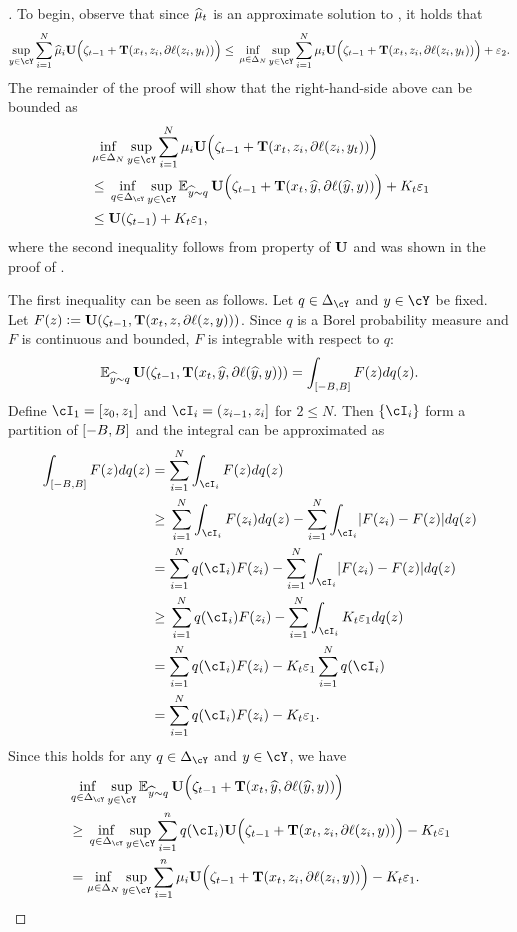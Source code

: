 \begin{proof}[]

To begin, observe that since $\wh{\mu}_{t}$ is an approximate solution to , it holds that
\[
\sup_{y\in\cY}\sum_{i=1}^{N}\wh{\mu}_{i}\burk\Big(\zeta_{t-1} + \suff(x_t,z_{i},\partial \loss(z_{i},y_t))\Big)
\leq{}
\inf_{\mu\in\Delta_{N}}\sup_{y\in\cY}\sum_{i=1}^{N}\mu_{i}\burk\Big(\zeta_{t-1} + \suff(x_t,z_{i},\partial \loss(z_{i},y_t))\Big)
+ \veps_{2}.
\]
The remainder of the proof will show that the right-hand-side above can be bounded as
\begin{align*}
&\inf_{\mu\in\Delta_{N}}\sup_{y\in\cY}\sum_{i=1}^{N}\mu_{i}\burk\Big(\zeta_{t-1} + \suff(x_t,z_{i},\partial \loss(z_{i},y_t))\Big) \\
&\leq{} \inf_{q\in\Delta_{\cY}}\sup_{y\in\cY}\En_{\yh\sim{}q}\burk\Big(\zeta_{t-1} + \suff(x_t,\pred,\partial \loss(\pred,y))\Big)
+ K_{t}\veps_{1} \\
&\leq{} \burk(\zeta_{t-1})
+ K_{t}\veps_{1},
\end{align*}
where the second inequality follows from property \propthree{} of $\burk$ and was shown in the proof of .

The first inequality can be seen as follows. Let $q\in\Delta_{\cY}$ and $y\in\cY$ be fixed. Let $F(z)\ldef{}\burk(\zeta_{t-1}, \suff(x_t, z, \partial\ls(z, y)))$. Since $q$ is a Borel probability measure and $F$ is continuous and bounded, $F$ is integrable with respect to $q$:
\[
\En_{\yh\sim{}q}\burk(\zeta_{t-1}, \suff(x_t, \yh, \partial\ls(\yh, y))) = \int_{\brk*{-B, B}}F(z)dq(z).
\]
Define $\cI_{1}=\brk*{z_0, z_1}$ and $\cI_{i}=(z_{i-1}, z_i]$ for $2\leq{}N$. Then $\crl*{\cI_i}$ form a partition of $\brk*{-B,B}$ and the integral can be approximated as
\begin{align*}
\int_{\brk*{-B, B}}F(z)dq(z) &= \sum_{i=1}^{N}\int_{\cI_{i}}F(z)dq(z) \\
&\geq{} \sum_{i=1}^{N}\int_{\cI_{i}}F(z_i)dq(z) - \sum_{i=1}^{N}\int_{\cI_{i}}\abs*{F(z_i)-F(z)}dq(z) \\
&= \sum_{i=1}^{N}q(\cI_i)F(z_i) - \sum_{i=1}^{N}\int_{\cI_{i}}\abs*{F(z_i)-F(z)}dq(z)\\
&\geq{} \sum_{i=1}^{N}q(\cI_i)F(z_i) - \sum_{i=1}^{N}\int_{\cI_{i}}K_{t}\veps_1dq(z)\\
&= \sum_{i=1}^{N}q(\cI_i)F(z_i) - K_{t}\veps_1\sum_{i=1}^{N}q(\cI_i) \\
&= \sum_{i=1}^{N}q(\cI_i)F(z_i) - K_{t}\veps_1.
\end{align*}
Since this holds for any $q\in\Delta_{\cY}$ and $y\in\cY$, we have
\begin{align*}
&\inf_{q\in\Delta_{\cY}}\sup_{y\in\cY}\En_{\yh\sim{}q}\burk\Big(\zeta_{t-1} + \suff(x_t,\pred,\partial \loss(\pred,y))\Big) \\
&\geq{} \inf_{q\in\Delta_{\cY}}\sup_{y\in\cY}\sum_{i=1}^{n}q(\cI_i)\burk\Big(\zeta_{t-1} + \suff(x_t,z_i,\partial \loss(z_i,y))\Big) - K_t\veps_1 \\
&= \inf_{\mu\in\Delta_{N}}\sup_{y\in\cY}\sum_{i=1}^{n}\mu_i\burk\Big(\zeta_{t-1} + \suff(x_t,z_i,\partial \loss(z_i,y))\Big) - K_t\veps_1.
\end{align*}


\end{proof}
